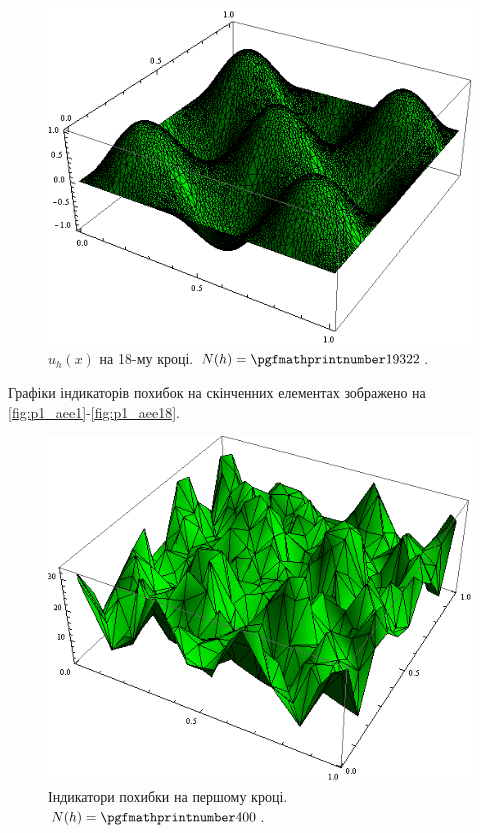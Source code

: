 \begin{figure}[H]
	\centering
    \includegraphics[width=\textwidth]{problem1/my/solutions/18}
    \caption{$u_h(x)$ на 18-му кроці. $N(h) = \nn{19322}$.}
    \label{fig:p1_solution18}
\end{figure}
%
\clearpage
Графіки індикаторів похибок на скінченних елементах зображено на \autoref{fig:p1_aee1}-\ref{fig:p1_aee18}.
%
\begin{figure}[H]
	\centering
    \includegraphics[scale=0.8]{problem1/my/AEE/1}
    \caption{Індикатори похибки на першому кроці.  $N(h) = \nn{400}$.}
    \label{fig:p1_aee1}
\end{figure}

